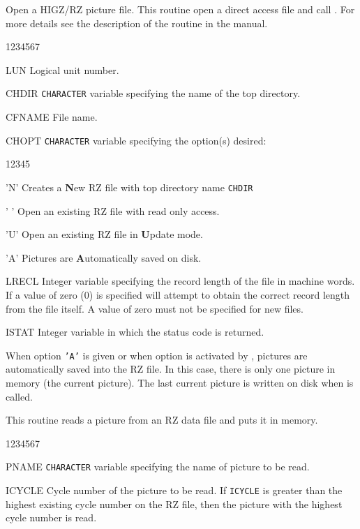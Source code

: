 \Action
Open a HIGZ/RZ picture file. This routine open a direct access file and
call . For more details see the description of the \ZEBRA{}
routine  in the \ZEBRA{} manual.
\Pdesc
\begin{DLtt}{1234567}
\item[LUN]    Logical unit number.
\item[CHDIR]  {\tt CHARACTER} variable specifying the name of
              the top directory.
\item[CFNAME] File name.
\item[CHOPT]  {\tt CHARACTER} variable specifying the option(s) desired:
\begin{DLtt}{12345}
   \item['N'] Creates a {\bf N}ew RZ file with top directory name {\tt CHDIR}
   \item[' '] Open an existing RZ file with read only access.
   \item['U'] Open an existing RZ file in {\bf U}pdate mode.
   \item['A'] Pictures are {\bf A}utomatically saved on disk.
\end{DLtt}
\item[LRECL]  Integer variable specifying the record length of the file in 
              machine words. If a value of zero (0) is specified 
              will attempt to obtain the correct record length from the file 
              itself. A value of zero must not be specified for new files.
\item[ISTAT]  Integer variable in which the status code is returned. 
\end{DLtt}
When option {\tt'A'} is given or when option  is activated by 
, pictures are automatically saved into the RZ file. In this case,
there is only one picture in memory (the current picture). The last current 
picture is written on disk when  is called.


\Action
This routine reads a picture from an RZ data file and puts it in memory.
\Pdesc
\begin{DLtt}{1234567}
\item[PNAME] {\tt CHARACTER} variable specifying the name of picture to be read.
\item[ICYCLE] Cycle number of the picture to be read.
If {\tt ICYCLE} is greater than the highest existing cycle number on the RZ 
file, then the picture with the highest cycle number is read.
\end{DLtt}


